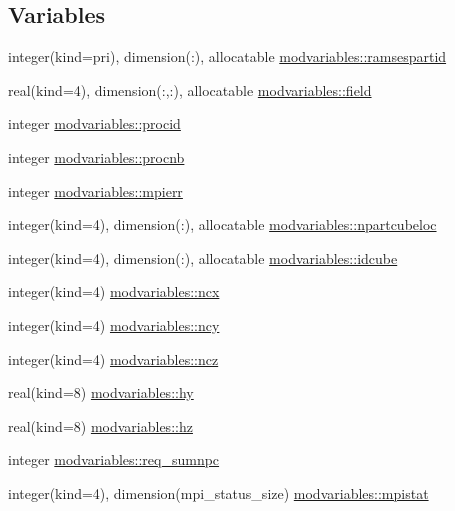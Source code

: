 \subsection*{Variables}
\begin{DoxyCompactItemize}
\item 
integer(kind=pri), dimension(\+:), allocatable \hyperlink{namespacemodvariables_aad55ee2cd6f458e86f0f8fa31339fac1}{modvariables\+::ramsespartid}
\item 
real(kind=4), dimension(\+:,\+:), allocatable \hyperlink{namespacemodvariables_a07bff5345df2040ae2d0f7e6d67f9a5c}{modvariables\+::field}
\item 
integer \hyperlink{namespacemodvariables_a27cda3ac7f6a8948a5f95e7dfa724167}{modvariables\+::procid}
\item 
integer \hyperlink{namespacemodvariables_ae51b502acd90a80a0134e81f92fbac15}{modvariables\+::procnb}
\item 
integer \hyperlink{namespacemodvariables_ab580e2bdf8eff875402911526f873de2}{modvariables\+::mpierr}
\item 
integer(kind=4), dimension(\+:), allocatable \hyperlink{namespacemodvariables_a32098f5e276eab031b1feebf7124f8bf}{modvariables\+::npartcubeloc}
\item 
integer(kind=4), dimension(\+:), allocatable \hyperlink{namespacemodvariables_a22925cb23ea4a80a06b3f4b67b62102e}{modvariables\+::idcube}
\item 
integer(kind=4) \hyperlink{namespacemodvariables_ab3c5e83108d2cc8318f235c1f889a162}{modvariables\+::ncx}
\item 
integer(kind=4) \hyperlink{namespacemodvariables_a1c1ff1a91ab25fd963a4ce5302249978}{modvariables\+::ncy}
\item 
integer(kind=4) \hyperlink{namespacemodvariables_ab75f9f5dd0ce07892cca908373a51ddc}{modvariables\+::ncz}
\item 
real(kind=8) \hyperlink{namespacemodvariables_a31a775c0bcadfce141cc3cebf22df9ff}{modvariables\+::hy}
\item 
real(kind=8) \hyperlink{namespacemodvariables_a26d18952766121089d4309f2449d8b29}{modvariables\+::hz}
\item 
integer \hyperlink{namespacemodvariables_a64644f9282a9c19faf8ccb44b0e60877}{modvariables\+::req\+\_\+sumnpc}
\item 
integer(kind=4), dimension(mpi\+\_\+status\+\_\+size) \hyperlink{namespacemodvariables_af6d0e7b2912dcb50b21940d5f8658be4}{modvariables\+::mpistat}
\end{DoxyCompactItemize}
